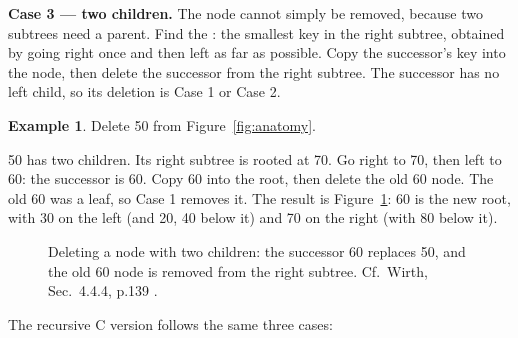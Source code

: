 \documentclass[11pt]{article}
\theoremstyle{definition}
\newtheorem{example}{Example}[section]
\begin{document}
\textbf{Case 3 --- two children.} The node cannot simply be removed, because
two subtrees need a parent. Find the : the smallest key in the
right subtree, obtained by going right once and then left as far as possible.
Copy the successor's key into the node, then delete the successor from the
right subtree. The successor has no left child, so its deletion is Case 1 or
Case 2.

\begin{example}
Delete 50 from Figure~\ref{fig:anatomy}.

50 has two children. Its right subtree is rooted at 70. Go right to 70, then
left to 60: the successor is 60. Copy 60 into the root, then delete the old
60 node. The old 60 was a leaf, so Case 1 removes it. The result is
Figure~\ref{fig:delete}: 60 is the new root, with 30 on the left (and 20, 40
below it) and 70 on the right (with 80 below it).
\end{example}

\begin{figure}[h]
  \centering
  \caption{Deleting a node with two children: the successor 60 replaces 50,
    and the old 60 node is removed from the right subtree. Cf.\ Wirth,
    Sec.~4.4.4, p.139 \cite{Wirth2004_algorithms_data_structures}.}
  \label{fig:delete}
\end{figure}

The recursive C version follows the same three cases:
\end{document}
